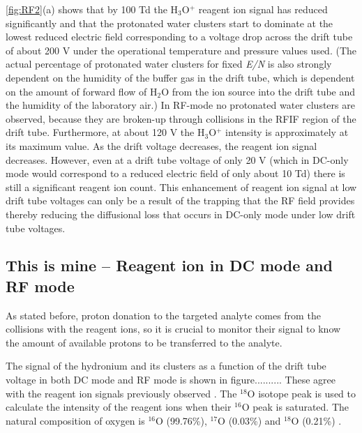 \autoref{fig:RF2}(a) shows that by 100 Td the H$_3$O$^+$ reagent ion signal has reduced significantly and that the protonated water clusters start to dominate at the lowest reduced electric field corresponding to a voltage drop across the drift tube of about 200 V under the operational temperature and pressure values used. (The actual percentage of protonated water clusters for fixed \textit{E/N} is also strongly dependent on the humidity of the buffer gas in the drift tube, which is dependent on the amount of forward flow of H$_2$O from the ion source into the drift tube and the humidity of the laboratory air.) In RF-mode no protonated water clusters are observed, because they are broken-up through collisions in the RFIF region of the drift tube. Furthermore, at about 120 V the H$_3$O$^+$ intensity is approximately at its maximum value. As the drift voltage decreases, the reagent ion signal decreases. However, even at a drift tube voltage of only 20 V (which in DC-only mode would correspond to a reduced electric field of only about 10 Td) there is still a significant reagent ion count. This enhancement of reagent ion signal at low drift tube voltages can only be a result of the trapping that the RF field provides thereby reducing the diffusional loss that occurs in DC-only mode under low drift tube voltages.













\subsection{This is mine -- Reagent ion in DC mode and RF mode}
As stated before, proton donation to the targeted analyte comes from the collisions with the reagent ions, so it is crucial to monitor their signal to know the amount of available protons to be transferred to the analyte.

The signal of the hydronium and its clusters as a function of the drift tube voltage in both DC mode and RF mode is shown in figure.......... 
These agree with the reagent ion signals previously observed \cite{price1977new}.
The $^{18}$O isotope peak is used to calculate the intensity of the reagent ions when their $^{16}$O peak is saturated. The natural composition of oxygen is $^{16}$O (99.76\%), $^{17}$O (0.03\%) and $^{18}$O (0.21\%) \cite{nistoxygen}. 

